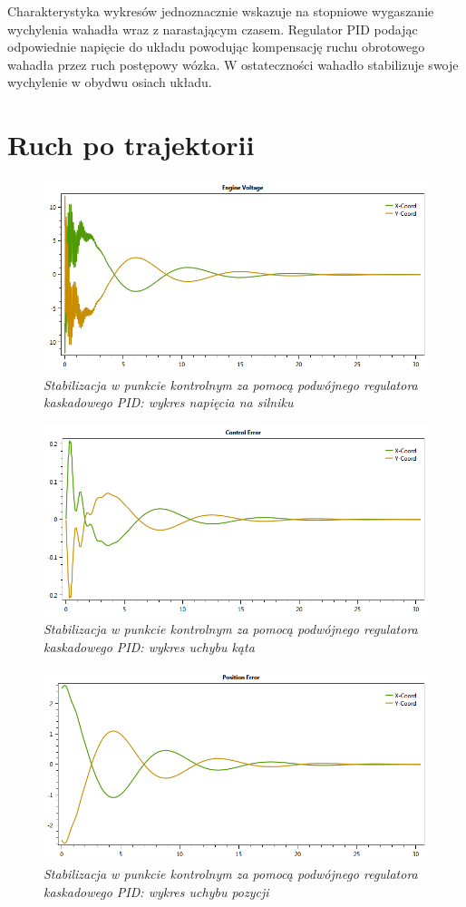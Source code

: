\documentclass[12pt, oneside]{report}
\theoremstyle{definition}
\begin{document}
Charakterystyka wykresów jednoznacznie wskazuje na stopniowe wygaszanie wychylenia wahadła wraz z narastającym czasem. Regulator PID podając odpowiednie napięcie do układu powodując kompensację ruchu obrotowego wahadła przez ruch postępowy wózka. W ostateczności wahadło stabilizuje swoje wychylenie w obydwu osiach układu.

\section{Ruch po trajektorii}
\begin{figure}[H]
	\centering
		\includegraphics[width = 320pt]{LineCasPIDEV} 
		\caption{\textit{Stabilizacja w punkcie kontrolnym za pomocą podwójnego regulatora kaskadowego PID: wykres napięcia na silniku}}
		\label{plot:LineCasPIDEV}
\end{figure}

\begin{figure}[H]
	\centering
		\includegraphics[width = 320pt]{LineCasPIDCEA} 
		\caption{\textit{Stabilizacja w punkcie kontrolnym za pomocą podwójnego regulatora kaskadowego PID: wykres uchybu kąta}}
		\label{plot:LineCasPIDCEA}
\end{figure}

\begin{figure}[H]
	\centering
		\includegraphics[width = 320pt]{LineCasPIDCEP} 
		\caption{\textit{Stabilizacja w punkcie kontrolnym za pomocą podwójnego regulatora kaskadowego PID: wykres uchybu pozycji}}
		\label{plot:LineCasPIDCEP}
\end{figure}
\end{document}
